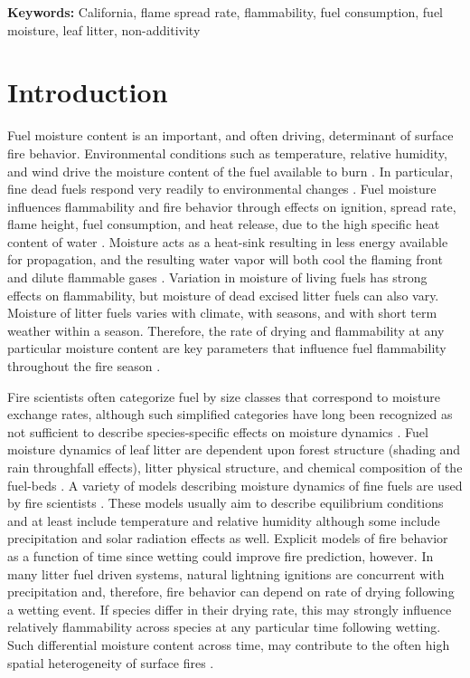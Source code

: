\documentclass[letterpaper,12pt]{article}
\begin{document}
\noindent \textbf{Keywords:} California, flame spread rate, flammability, fuel consumption, fuel moisture, leaf litter, non-additivity

\newpage

\section*{Introduction}

Fuel moisture content is an important, and often driving, determinant of
surface fire behavior. Environmental conditions such as temperature, relative
humidity, and wind drive the moisture content of the fuel available to burn
\citep{Kreye+Varner+etal-2018}. In particular, fine dead fuels respond very
readily to environmental changes \citep{Nelson-2001}. Fuel moisture influences
flammability and fire behavior through effects on ignition, spread rate, flame
height, fuel consumption, and heat release, due to the high specific heat
content of water \citep{Rothermel-1972, Nelson-2011}. Moisture acts as a
heat-sink resulting in less energy available for propagation, and the resulting
water vapor will both cool the flaming front and dilute flammable gases
\citep{Albini-1976, Shafizadeh-1977}. Variation in moisture of living fuels has
strong effects on flammability, but moisture of dead excised litter fuels can
also vary. Moisture of litter fuels varies with climate, with seasons, and with
short term weather within a season. Therefore, the rate of drying and
flammability at any particular moisture content are key parameters that
influence fuel flammability throughout the fire season \citep{Nelson-2001}.

Fire scientists often categorize fuel by size classes that correspond to
moisture exchange rates, although such simplified categories have long been
recognized as not sufficient to describe species-specific effects on moisture
dynamics \citep{Anderson-1985}. Fuel moisture dynamics of leaf litter are
dependent upon forest structure (shading and rain throughfall effects), litter
physical structure, and chemical composition of the fuel-beds
\citep{Nelson+Hiers-2008, Matthews-2014, Kreye_Hiers_etal-2018}. A variety of
models describing moisture dynamics of fine fuels are used by fire scientists
\citep{Viney-1991, Nelson-2000, Catchpole+Catchpole+etal-2001}. These models
usually aim to describe equilibrium conditions and at least include temperature
and relative humidity although some include precipitation and solar radiation
effects as well. Explicit models of fire behavior as a function of time since
wetting could improve fire prediction, however. In many litter fuel driven
systems, natural lightning ignitions are concurrent with precipitation and,
therefore, fire behavior can depend on rate of drying following a wetting
event. If species differ in their drying rate, this may strongly influence
relatively flammability across species at any particular time following
wetting. Such differential moisture content across time, may contribute to the
often high spatial heterogeneity of surface fires
\citep{Knapp_Schwilk_etal-2006, Kreye_Hiers_etal-2018}.
\end{document}
